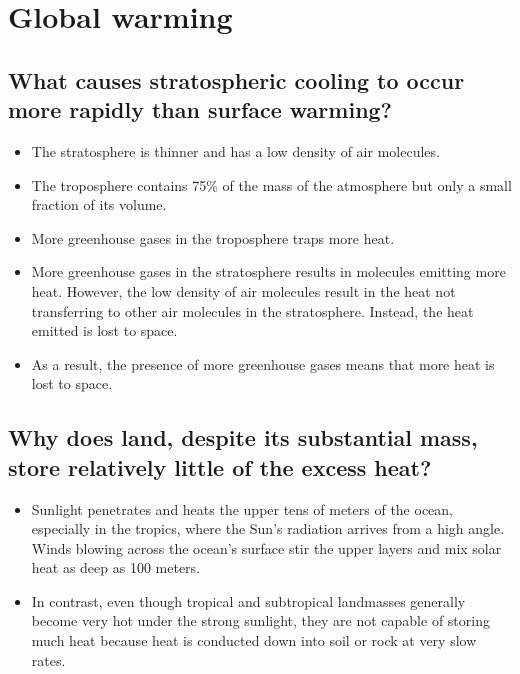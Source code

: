 \documentclass[11pt]{article}
\begin{document}
\section{Global warming}
\label{sec:org078df7a}

\subsection{What causes stratospheric cooling to occur more rapidly than surface warming?}
\label{sec:org4d3f87b}
\begin{itemize}
\item The stratosphere is thinner and has a low density of air molecules.
\item The troposphere contains 75\% of the mass of the atmosphere but only a small fraction of its volume.
\item More greenhouse gases in the troposphere traps more heat.
\item More greenhouse gases in the stratosphere results in molecules emitting more heat. However, the low density of air molecules result in the heat not transferring to other air molecules in the stratosphere. Instead, the heat emitted is lost to space.
\item As a result, the presence of more greenhouse gases means that more heat is lost to space.
\end{itemize}
\subsection{Why does land, despite its substantial mass, store relatively little of the excess heat?}
\label{sec:org0e9827e}
\begin{itemize}
\item Sunlight penetrates and heats the upper tens of meters of the ocean, especially in the tropics, where the Sun's radiation arrives from a high angle. Winds blowing across the ocean's surface stir the upper layers and mix solar heat as deep as 100 meters.
\item In contrast, even though tropical and subtropical landmasses generally become very hot under the strong sunlight, they are not capable of storing much heat because heat is conducted down into soil or rock at very slow rates.
\end{itemize}

\newpage
\end{document}
